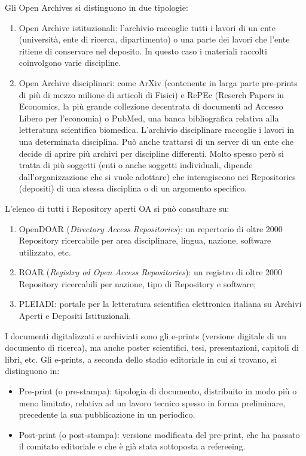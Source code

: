 {Gli Open Archives si distinguono in due tipologie:

\begin{enumerate}
\def\labelenumi{\arabic{enumi}.}
\item
  Open Archive istituzionali: l'archivio raccoglie tutti i lavori di un
  ente (università, ente di ricerca, dipartimento) o una parte dei
  lavori che l'ente ritiene di conservare nel deposito. In questo caso i
  materiali raccolti coinvolgono varie discipline.
\item
  Open Archive disciplinari: come ArXiv (contenente in larga parte
  pre-prints di più di mezzo milione di articoli di Fisici) e RePEc
  (Reserch Papers in Economics, la più grande collezione decentrata di
  documenti ad Accesso Libero per l'economia) o PubMed, una banca
  bibliografica relativa alla letteratura scientifica biomedica.
  L'archivio disciplinare raccoglie i lavori in una determinata
  disciplina. Può anche trattarsi di un server di un ente che decide di
  aprire più archivi per discipline differenti. Molto spesso però si
  tratta di più soggetti (enti o anche soggetti individuali, dipende
  dall'organizzazione che si vuole adottare) che interagiscono nei
  Repositories (depositi) di una stessa disciplina o di un argomento
  specifico.
\end{enumerate}

L'elenco di tutti i Repository aperti OA si può consultare su:

\begin{enumerate}
\def\labelenumi{\arabic{enumi}.}
\item
  OpenDOAR (\emph{Directory Access Repositories}): un repertorio di
  oltre 2000 Repository ricercabile per area disciplinare, lingua,
  nazione, software utilizzato, etc.
\item
  ROAR (\emph{Registry od Open Access Repositories}): un registro di
  oltre 2000 Repository ricercabili per nazione, tipo di Repository e
  software;
\item
  PLEIADI: portale per la letteratura scientifica elettronica italiana
  su Archivi Aperti e Depositi Istituzionali.
\end{enumerate}

I documenti digitalizzati e archiviati sono gli e-prints (versione
digitale di un documento di ricerca), ma anche poster scientifici, tesi,
presentazioni, capitoli di libri, etc. Gli e-prints, a seconda dello
stadio editoriale in cui si trovano, si distinguono in:

\begin{itemize}
\item
  Pre-print (o pre-stampa): tipologia di documento, distribuito in modo
  più o meno limitato, relativa ad un lavoro tecnico spesso in forma
  preliminare, precedente la sua pubblicazione in un periodico.
\item
  Post-print (o post-stampa): versione modificata del pre-print, che ha
  passato il comitato editoriale e che è già stata sottoposta a
  refereeing.
\end{itemize}

}
